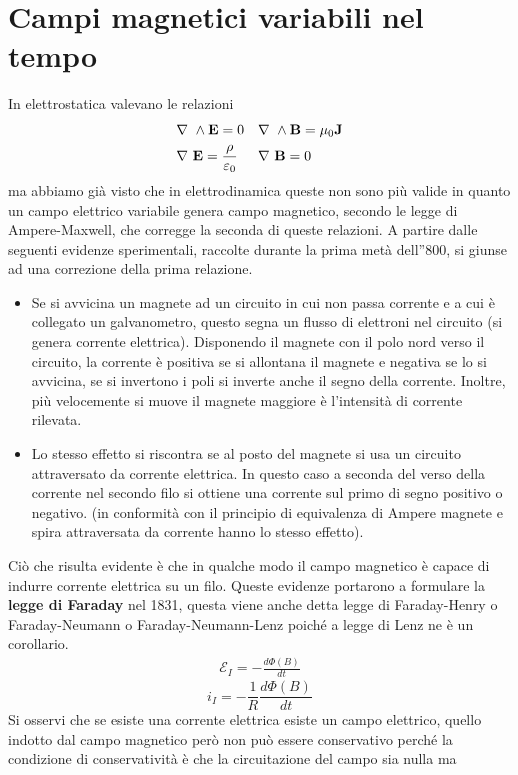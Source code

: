 \documentclass[
10pt, %
a4paper, %
oneside, %
headinclude,footinclude, %
BCOR5mm, %
]{scrartcl}
\begin{document}
\section{Campi magnetici variabili nel tempo}
In elettrostatica valevano le relazioni
\begin{align*}
&\nabla\ \wedge\mathbf{E}=0&&\nabla\ \wedge\mathbf{B}=\mu_0\mathbf{J}\\
&\nabla\ \mathbf{E}=\frac{\rho}{\varepsilon_0}&&\nabla\ \mathbf{B}=0
\end{align*}
ma abbiamo già visto che in elettrodinamica queste non sono più valide in quanto un campo elettrico variabile genera campo magnetico, secondo le legge di Ampere-Maxwell, che corregge la seconda di queste relazioni. A partire dalle seguenti evidenze sperimentali, raccolte durante la prima metà dell''800, si giunse ad una correzione della prima relazione.\\
\begin{itemize}
	\item Se si avvicina un magnete ad un circuito in cui non passa corrente e a cui è collegato un galvanometro, questo segna un flusso di elettroni nel circuito (si genera corrente elettrica). Disponendo il magnete con il polo nord verso il circuito, la corrente è positiva se si allontana il magnete e negativa se lo si avvicina, se si invertono i poli si inverte anche il segno della corrente. Inoltre, più velocemente si muove il magnete maggiore è l'intensità di corrente rilevata.
	\item Lo stesso effetto si riscontra se al posto del magnete si usa un circuito attraversato da corrente elettrica. In questo caso a seconda del verso della corrente nel secondo filo si ottiene una corrente sul primo di segno positivo o negativo. (in conformità con il principio di equivalenza di Ampere magnete e spira attraversata da corrente hanno lo stesso effetto).
\end{itemize}
Ciò che risulta evidente è che in qualche modo il campo magnetico è capace di indurre corrente elettrica su un filo. Queste evidenze portarono a formulare la \textbf{legge di Faraday} nel 1831, questa viene anche detta legge di Faraday-Henry o Faraday-Neumann o Faraday-Neumann-Lenz poiché a legge di Lenz ne è un corollario.
\begin{align}\label{eq:Faraday_integrale}
	\mathcal{E}_I = -\frac{d\Phi(B)}{dt}
\end{align}
\[i_I = -\frac{1}{R}\frac{d\Phi(B)}{dt}\]
Si osservi che se esiste una corrente elettrica esiste un campo elettrico, quello indotto dal campo magnetico però non può essere conservativo perché la condizione di conservatività è che la circuitazione del campo sia nulla ma
\end{document}
